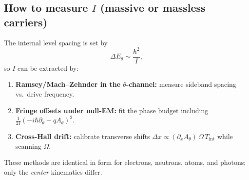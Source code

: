\subsection{How to measure $I$ (massive or massless carriers)}
The internal level spacing is set by
\begin{equation}
\Delta E_\theta\sim \frac{\hbar^2}{I},
\end{equation}
so $I$ can be extracted by:
\begin{enumerate}
\item \textbf{Ramsey/Mach--Zehnder in the $\theta$-channel:} measure sideband spacing vs.\ drive frequency.
\item \textbf{Fringe offsets under null-EM:} fit the phase budget including $\tfrac{1}{2I}(-i\hbar\partial_\theta-qA_\theta)^2$.
\item \textbf{Cross-Hall drift:} calibrate transverse shifts $\Delta x\propto (\partial_xA_\theta)\,\Omega\,T_\text{int}$ while scanning $\Omega$.
\end{enumerate}
These methods are identical in form for electrons, neutrons, atoms, and photons; only the \emph{center}
kinematics differ.

